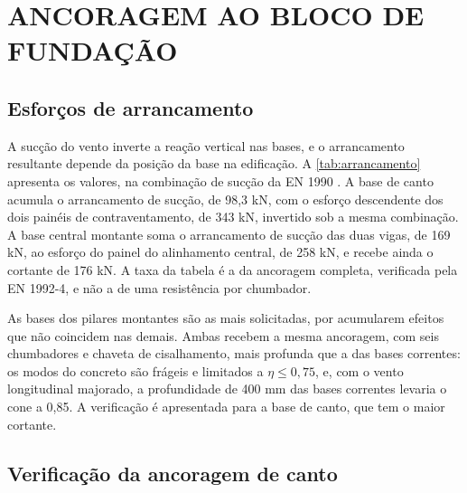 \section{ANCORAGEM AO BLOCO DE FUNDAÇÃO}\label{sec:ancoragem}

\subsection{Esforços de arrancamento}\label{ssec:arrancamento}

A sucção do vento inverte a reação vertical nas bases, e o arrancamento
resultante depende da posição da base na edificação. A
\autoref{tab:arrancamento} apresenta os valores, na combinação de sucção da
EN 1990 \cite{EN1990:2002}. A base de canto acumula o arrancamento de sucção, de
98,3 kN, com o esforço descendente dos dois painéis de contraventamento, de
343 kN, invertido sob a mesma combinação. A base central montante soma o
arrancamento de sucção das duas vigas, de 169 kN, ao esforço do painel do
alinhamento central, de 258 kN, e recebe ainda o cortante de 176 kN. A taxa da
tabela é a da ancoragem completa, verificada pela EN 1992-4, e não a de uma
resistência por chumbador.


As bases dos pilares montantes são as mais solicitadas, por acumularem
efeitos que não coincidem nas demais. Ambas recebem a mesma ancoragem, com seis
chumbadores e chaveta de cisalhamento, mais profunda que a das bases correntes:
os modos do concreto são frágeis e limitados a $\eta \leq 0{,}75$, e, com o vento
longitudinal majorado, a profundidade de 400 mm das bases correntes levaria o cone
a 0,85. A verificação é apresentada para a base de
canto, que tem o maior cortante.

\subsection{Verificação da ancoragem de canto}\label{ssec:ancoragem-canto}

